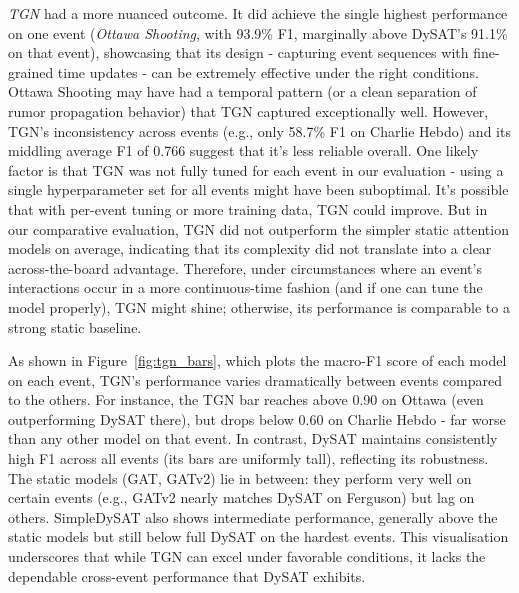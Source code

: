 \documentclass{cshonours}
\begin{document}
\emph{TGN} had a more nuanced outcome. It did achieve the single highest performance on one event (\emph{Ottawa Shooting}, with 93.9\% F1, marginally above DySAT's 91.1\% on that event), showcasing that its design - capturing event sequences with fine-grained time updates - can be extremely effective under the right conditions. Ottawa Shooting may have had a temporal pattern (or a clean separation of rumor propagation behavior) that TGN captured exceptionally well. However, TGN's inconsistency across events (e.g., only 58.7\% F1 on Charlie Hebdo) and its middling average F1 of 0.766 suggest that it's less reliable overall. One likely factor is that TGN was not fully tuned for each event in our evaluation - using a single hyperparameter set for all events might have been suboptimal. It's possible that with per-event tuning or more training data, TGN could improve. But in our comparative evaluation, TGN did not outperform the simpler static attention models on average, indicating that its complexity did not translate into a clear across-the-board advantage. Therefore, under circumstances where an event's interactions occur in a more continuous-time fashion (and if one can tune the model properly), TGN might shine; otherwise, its performance is comparable to a strong static baseline.



As shown in Figure~\ref{fig:tgn_bars}, which plots the macro-F1 score of each model on each event, TGN's performance varies dramatically between events compared to the others. For instance, the TGN bar reaches above 0.90 on Ottawa (even outperforming DySAT there), but drops below 0.60 on Charlie Hebdo - far worse than any other model on that event. In contrast, DySAT maintains consistently high F1 across all events (its bars are uniformly tall), reflecting its robustness. The static models (GAT, GATv2) lie in between: they perform very well on certain events (e.g., GATv2 nearly matches DySAT on Ferguson) but lag on others. SimpleDySAT also shows intermediate performance, generally above the static models but still below full DySAT on the hardest events. This visualisation underscores that while TGN can excel under favorable conditions, it lacks the dependable cross-event performance that DySAT exhibits.
\end{document}
